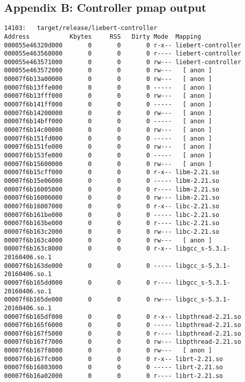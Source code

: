     \subsection{Appendix B: Controller pmap output}\label{apd:pmap-controller}
        \begin{verbatim}
14103:   target/release/liebert-controller
Address           Kbytes     RSS   Dirty Mode  Mapping
000055e46320d000       0       0       0 r-x-- liebert-controller
000055e463568000       0       0       0 r---- liebert-controller
000055e463571000       0       0       0 rw--- liebert-controller
000055e463572000       0       0       0 rw---   [ anon ]
00007f6b13a00000       0       0       0 rw---   [ anon ]
00007f6b13ffe000       0       0       0 -----   [ anon ]
00007f6b13fff000       0       0       0 rw---   [ anon ]
00007f6b141ff000       0       0       0 -----   [ anon ]
00007f6b14200000       0       0       0 rw---   [ anon ]
00007f6b14bff000       0       0       0 -----   [ anon ]
00007f6b14c00000       0       0       0 rw---   [ anon ]
00007f6b151fd000       0       0       0 -----   [ anon ]
00007f6b151fe000       0       0       0 rw---   [ anon ]
00007f6b153fe000       0       0       0 -----   [ anon ]
00007f6b15600000       0       0       0 rw---   [ anon ]
00007f6b15cff000       0       0       0 r-x-- libm-2.21.so
00007f6b15e06000       0       0       0 ----- libm-2.21.so
00007f6b16005000       0       0       0 r---- libm-2.21.so
00007f6b16006000       0       0       0 rw--- libm-2.21.so
00007f6b16007000       0       0       0 r-x-- libc-2.21.so
00007f6b161be000       0       0       0 ----- libc-2.21.so
00007f6b163be000       0       0       0 r---- libc-2.21.so
00007f6b163c2000       0       0       0 rw--- libc-2.21.so
00007f6b163c4000       0       0       0 rw---   [ anon ]
00007f6b163c8000       0       0       0 r-x-- libgcc_s-5.3.1-20160406.so.1
00007f6b163de000       0       0       0 ----- libgcc_s-5.3.1-20160406.so.1
00007f6b165dd000       0       0       0 r---- libgcc_s-5.3.1-20160406.so.1
00007f6b165de000       0       0       0 rw--- libgcc_s-5.3.1-20160406.so.1
00007f6b165df000       0       0       0 r-x-- libpthread-2.21.so
00007f6b165f6000       0       0       0 ----- libpthread-2.21.so
00007f6b167f5000       0       0       0 r---- libpthread-2.21.so
00007f6b167f7000       0       0       0 rw--- libpthread-2.21.so
00007f6b167f8000       0       0       0 rw---   [ anon ]
00007f6b167fc000       0       0       0 r-x-- librt-2.21.so
00007f6b16803000       0       0       0 ----- librt-2.21.so
00007f6b16a02000       0       0       0 r---- librt-2.21.so

\end{verbatim}
